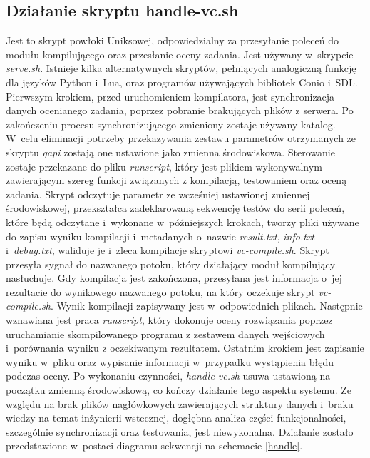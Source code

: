 \subsection{Działanie skryptu handle-vc.sh}
Jest to skrypt powłoki Uniksowej, odpowiedzialny za przesyłanie poleceń do modułu kompilującego oraz przesłanie oceny zadania. Jest używany w~skrypcie \textit{serve.sh}. Istnieje kilka alternatywnych skryptów, pełniących analogiczną funkcję dla języków Python i~Lua, oraz programów używających bibliotek Conio i~SDL. Pierwszym krokiem, przed uruchomieniem kompilatora, jest synchronizacja danych ocenianego zadania, poprzez pobranie brakujących plików z serwera. Po zakończeniu procesu synchronizującego zmieniony zostaje używany katalog. W~celu eliminacji potrzeby przekazywania zestawu parametrów otrzymanych ze skryptu \textit{qapi} zostają one ustawione jako zmienna środowiskowa. Sterowanie zostaje przekazane do pliku \textit{runscript}, który jest plikiem wykonywalnym zawierającym szereg funkcji związanych z kompilacją, testowaniem oraz oceną zadania. Skrypt odczytuje parametr ze wcześniej ustawionej zmiennej środowiskowej, przekształca zadeklarowaną sekwencję testów do serii poleceń, które będą odczytane i~wykonane w~późniejszych krokach, tworzy pliki używane do zapisu wyniku kompilacji i~metadanych o~nazwie \textit{result.txt}, \textit{info.txt} i~\textit{debug.txt}, waliduje je i~zleca kompilacje skryptowi \textit{vc-compile.sh}. Skrypt przesyła sygnał do nazwanego potoku, który działający moduł kompilujący nasłuchuje. Gdy kompilacja jest zakończona, przesyłana jest informacja o~jej rezultacie do wynikowego nazwanego potoku, na który oczekuje skrypt \textit{vc-compile.sh}. Wynik kompilacji zapisywany jest w~odpowiednich plikach. Następnie wznawiana jest praca \textit{runscript}, który dokonuje oceny rozwiązania poprzez uruchamianie skompilowanego programu z zestawem danych wejściowych i~porównania wyniku z oczekiwanym rezultatem. Ostatnim krokiem jest zapisanie wyniku w~pliku oraz wypisanie informacji w~przypadku wystąpienia błędu podczas oceny. Po wykonaniu czynności, \textit{handle-vc.sh} usuwa ustawioną na początku zmienną środowiskową, co kończy działanie tego aspektu systemu. Ze względu na brak plików nagłówkowych zawierających struktury danych i~braku wiedzy na temat inżynierii wstecznej, dogłębna analiza części funkcjonalności, szczególnie synchronizacji oraz testowania, jest niewykonalna. Działanie zostało przedstawione w~postaci diagramu sekwencji na schemacie \ref{handle}.
